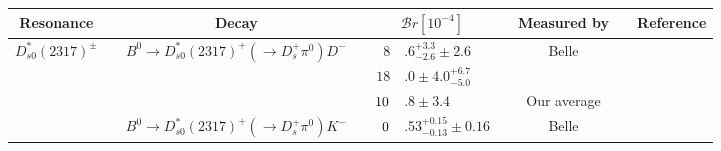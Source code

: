 \begin{adjustbox}{width=\textwidth,center}
{\setlength\tabcolsep{0pt}
	\begin{tabular}{cp{5pt}cp{5pt}r@{}lp{5pt}cp{5pt}c}
		\toprule
		\rowcolor{Gray} Resonance &   & Decay &   & \multicolumn{2}{c}{$\mathcal{B}r[10^{-4}]$} &   & \multicolumn{1}{c}{Measured by} &   & \multicolumn{1}{c}{Reference} \\ \midrule								
	\multirow{4}{*}[-5pt]{$D_{s0}^{*}(2317)^{\pm}$}	&&	\multirow{3}{*}{$B^{0}\to D_{s0}^{*}(2317)^{+}(\to D^{+}_{s}\pi^{0})D^{-}$}	&&$	8$&$.6^{+3.3}_{-2.6}\pm2.6	$&&	Belle	&&	\cite{Krokovny:2003zq}        \\
		&&		&&$	18$&$.0\pm 4.0{}^{+6.7}_{-5.0}	$&&	\babar{}	&&	\cite{Aubert:2004pw}          \\  \cmidrule{4-9}
		&&		&\cellcolor{Gray}&$	\cellcolor{Gray}10$&\cellcolor{Gray}$.8 \pm 3.4	$&\cellcolor{Gray}&	\cellcolor{Gray}  Our average	&\cellcolor{Gray}&	\\ \cmidrule{3-9}
		&&	\multirow{1}{*}{$B^{0}\to D_{s0}^{*}(2317)^{+}(\to D^{+}_{s}\pi^{0})K^{-}$}	&\cellcolor{LightGray} &$	\cellcolor{LightGray}  0$&\cellcolor{LightGray}$.53^{+0.15}_{-0.13}\pm0.16	$&\cellcolor{LightGray}&	\cellcolor{LightGray}  Belle	&\cellcolor{LightGray}&	\cite{Abe:2004wz}             \\ \midrule
									

\end{tabular}}
\end{adjustbox}

